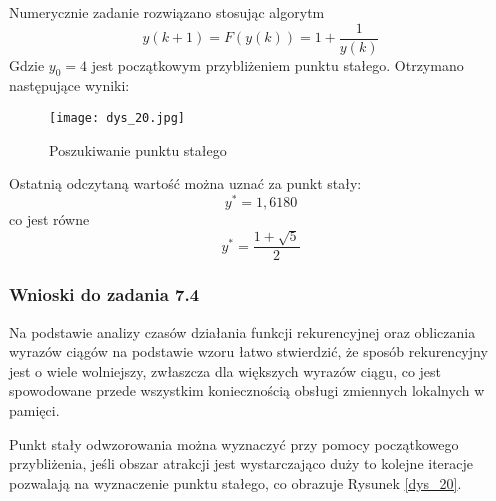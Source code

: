 \documentclass[a4paper,11pt]{article}
\begin{document}
Numerycznie zadanie rozwiązano stosując algorytm 
\begin{equation*}
y(k+1)=F(y(k))=1+\frac{1}{y(k)}
\end{equation*}
Gdzie \( y_{0}=4 \) jest początkowym przybliżeniem punktu stałego. 
Otrzymano następujące wyniki:
\begin{figure}[H]
\centerline{\texttt{[image: dys\_20.jpg]}}
\caption{Poszukiwanie punktu stałego}
\label{fig:dys_20}
\end{figure}
Ostatnią odczytaną wartość można uznać za punkt stały:
\begin{equation*}
y^{*}=1,6180
\end{equation*}
co jest równe 
\begin{equation*}
y^{*}=\frac{1+\sqrt{5}}{2}
\end{equation*}
\subsubsection{Wnioski do zadania 7.4}
Na podstawie analizy czasów działania funkcji rekurencyjnej oraz obliczania wyrazów ciągów na podstawie wzoru łatwo stwierdzić, że sposób rekurencyjny jest o wiele wolniejszy, zwłaszcza dla większych wyrazów ciągu, co jest spowodowane przede wszystkim koniecznością obsługi zmiennych lokalnych w pamięci. 

Punkt stały odwzorowania można wyznaczyć przy pomocy początkowego przybliżenia, jeśli obszar atrakcji jest wystarczająco duży to kolejne iteracje pozwalają na wyznaczenie punktu stałego, co obrazuje Rysunek \ref{dys_20}.
\end{document}

